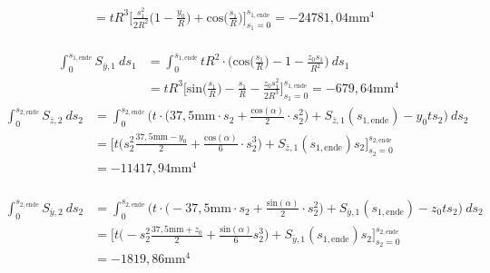 \begin{itemize}
\begin{equation}
\begin{split}
			&=tR^3\bigg[\frac{s_1^2}{2R^2}\bigg(1-\frac{y_0}{R}\bigg)+\mathrm{cos}\bigg(\frac{s_1}{R}\bigg)\bigg]_{s_1=0}^{s_{1,\mathrm{ende}}} = -24781,04\mathrm{mm}^4
		\end{split}
	\end{equation}\\
	\begin{equation}
		\begin{split}
			\int_{0}^{s_{1,\mathrm{ende}}} S_{\bar y,1}\ ds_1 &= \int_{0}^{s_{1,\mathrm{ende}}} tR^2 \cdot\bigg(\mathrm{cos}\bigg(\frac{s_1}{R}\bigg)-1 - \frac{z_0s_1}{R^2}\bigg)\ ds_1\\\
			&=tR^3\bigg[\mathrm{sin}\bigg(\frac{s_1}{R}\bigg) -\frac{s_1}{R} - \frac{z_0s_1^2}{2R^3}\bigg]_{s_1=0}^{s_{1,\mathrm{ende}}} = -679,64\mathrm{mm}^4
		\end{split}
	\end{equation}
	\begin{equation}
		\begin{split}
			\int_{0}^{s_{2,\mathrm{ende}}} S_{\bar z,2}\ ds_2 &= \int_{0}^{s_{2,\mathrm{ende}}}  \bigg(t\cdot\bigg(37,5\mathrm{mm}\cdot s_2 +\frac{\mathrm{cos}(\alpha)}{2}\cdot s^2_2\bigg) + S_{\bar z,1}(s_{1,\mathrm{ende}})-y_0ts_2\bigg)\ ds_2\\\
			&=\bigg[t\bigg(s_2^2\frac{37,5\mathrm{mm}-y_0}{2}+\frac{\mathrm{cos}(\alpha)}{6}\cdot s^3_2\bigg)+S_{\bar z,1}(s_{1,\mathrm{ende}})s_2\bigg]_{s_2=0}^{s_{2,\mathrm{ende}}}\\\
			&= -11417,94\mathrm{mm}^4
		\end{split}
	\end{equation}\\
	\begin{equation}
		\begin{split}
			\int_{0}^{s_{2,\mathrm{ende}}} S_{\bar y,2}\ ds_2 &= \int_{0}^{s_{2,\mathrm{ende}}}\bigg( t\cdot\bigg(-37,5\mathrm{mm}\cdot s_2 +\frac{\mathrm{sin}(\alpha)}{2}\cdot s^2_2\bigg) + S_{\bar y,1}(s_{1,\mathrm{ende}}) - z_0ts_2\bigg)\ ds_2\\\
			&= \bigg[t\bigg(-s_2^2\frac{37,5\mathrm{mm}+z_0}{2}+\frac{\mathrm{sin}(\alpha)}{6}s_2^3\bigg)+S_{\bar y,1}(s_{1,\mathrm{ende}})s_2\bigg]_{s_2=0}^{s_{2,\mathrm{ende}}}\\\
			&=-1819,86\mathrm{mm}^4
		\end{split}
	\end{equation}\\
	\begin{equation}
		\begin{split}

\end{split}
\end{equation}
\end{itemize}
